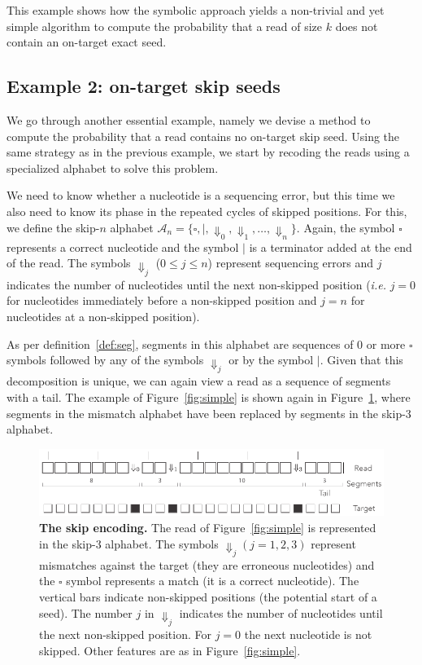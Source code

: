 \documentclass{article}
\begin{document}
This example shows how the symbolic approach yields a non-trivial and yet
simple algorithm to compute the probability that a read of size $k$ does
not contain an on-target exact seed.


\subsection{Example 2: on-target skip seeds}
\label{sec:example_skip}

We go through another essential example, namely we devise a method to
compute the probability that a read contains no on-target skip seed. Using
the same strategy as in the previous example, we start by recoding the
reads using a specialized alphabet to solve this problem.

We need to know whether a nucleotide is a sequencing error, but this time
we also need to know its phase in the repeated cycles of skipped
positions. For this, we define the skip-$n$ alphabet $\mathcal{A}_n =
\{\square, |, \Downarrow_0, \Downarrow_1, \ldots, \Downarrow_n \}$. Again,
the symbol $\square$ represents a correct nucleotide and the symbol $|$ is
a terminator added at the end of the read. The symbols $\Downarrow_j$ ($ 0
\leq j \leq n$) represent sequencing errors and $j$ indicates the number
of nucleotides until the next non-skipped position (\textit{i.e.} $j=0$
for nucleotides immediately before a non-skipped position and $j=n$ for
nucleotides at a non-skipped position).

As per definition~\ref{def:seg}, segments in this alphabet are sequences
of 0 or more $\square$ symbols followed by any of the symbols
$\Downarrow_j$ or by the symbol $|$. Given that this decomposition is
unique, we can again view a read as a sequence of segments with a tail.
The example of Figure~\ref{fig:simple} is shown again in
Figure~\ref{fig:skip}, where segments in the mismatch alphabet have been
replaced by segments in the skip-3 alphabet.

\begin{figure}[h]
\centering
\includegraphics[scale=0.85]{sketch_skip.pdf}
\caption{\textbf{The skip encoding.}
The read of Figure~\ref{fig:simple} is represented in the skip-3 alphabet.
The symbols $\Downarrow_j (j = 1,2,3)$ represent mismatches against the
target (they are erroneous nucleotides) and the $\square$ symbol
represents a match (it is a correct nucleotide). The vertical bars
indicate non-skipped positions (the potential start of a seed). The number
$j$ in $\Downarrow_j$ indicates the number of nucleotides until the next
non-skipped position. For $j=0$ the next nucleotide is not skipped.
Other features are as in Figure~\ref{fig:simple}.}
\label{fig:skip}
\end{figure}
\end{document}
